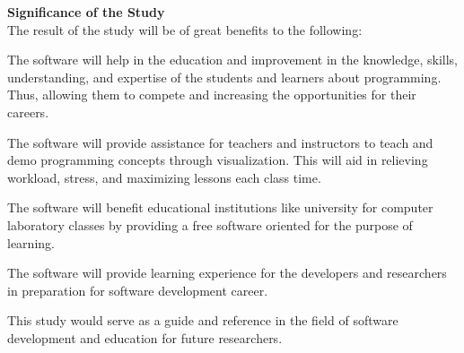 \flushleft
\textbf{Significance of the Study}\\
\justifying
\parx
The result of the study will be of great benefits to the following:

\parx
The software will help in the education and improvement in the knowledge,
skills, understanding, and expertise of the students and learners about
programming. Thus, allowing them to compete and increasing the opportunities for
their careers.

\parx
The software will provide assistance for teachers and instructors to teach and
demo programming concepts through visualization. This will aid in relieving
workload, stress, and maximizing lessons each class time.

\parx
The software will benefit educational institutions like university for computer
laboratory classes by providing a free software oriented for the purpose of
learning.

\parx
The software will provide learning experience for the developers and researchers
in preparation for software development career.

\parx
This study would serve as a guide and reference in the field of software
development and education for future researchers.\\
